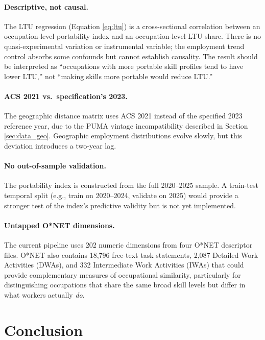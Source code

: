 \documentclass[12pt]{article}
\begin{document}
\paragraph{Descriptive, not causal.} The LTU regression (Equation \ref{eq:ltu}) is a cross-sectional correlation between an occupation-level portability index and an occupation-level LTU share. There is no quasi-experimental variation or instrumental variable; the employment trend control absorbs some confounds but cannot establish causality. The result should be interpreted as ``occupations with more portable skill profiles tend to have lower LTU,'' not ``making skills more portable would reduce LTU.''

\paragraph{ACS 2021 vs.\ specification's 2023.} The geographic distance matrix uses ACS 2021 instead of the specified 2023 reference year, due to the PUMA vintage incompatibility described in Section \ref{sec:data_geo}. Geographic employment distributions evolve slowly, but this deviation introduces a two-year lag.

\paragraph{No out-of-sample validation.} The portability index is constructed from the full 2020--2025 sample. A train-test temporal split (e.g., train on 2020--2024, validate on 2025) would provide a stronger test of the index's predictive validity but is not yet implemented.

\paragraph{Untapped O*NET dimensions.} The current pipeline uses 202 numeric dimensions from four O*NET descriptor files. O*NET also contains 18,796 free-text task statements, 2,087 Detailed Work Activities (DWAs), and 332 Intermediate Work Activities (IWAs) that could provide complementary measures of occupational similarity, particularly for distinguishing occupations that share the same broad skill levels but differ in what workers actually \emph{do}.

\section{Conclusion}
\label{sec:conclusion}
\end{document}

